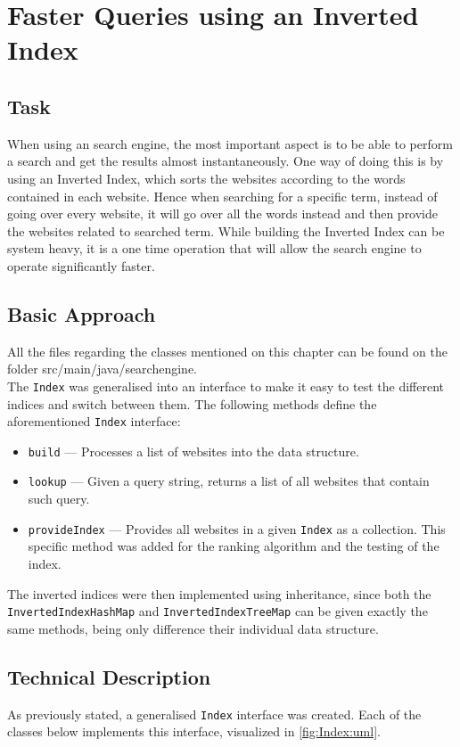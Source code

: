 \chapter{Faster Queries using an Inverted Index}

\section{Task}
When using an search engine, the most important aspect is to be able to perform a search and get the results almost instantaneously. One way of doing this is by using an Inverted Index, which sorts the websites according to the words contained in each website. Hence when searching for a specific term, instead of going over every website, it will go over all the words instead and then provide the websites related to searched term. While building the Inverted Index can be system heavy, it is a one time operation that will allow the search engine to operate significantly faster.

\section{Basic Approach}
All the files regarding the classes mentioned on this chapter can be found on the folder src/main/java/searchengine.\\
The {\tt Index} was generalised into an interface to make it easy to test the different indices and switch between them. The following methods define the aforementioned {\tt Index} interface:
\begin{itemize}
    \item {\tt build} — Processes a list of websites into the data structure.
    \item {\tt lookup} — Given a query string, returns a list of all websites that contain such query.
    \item {\tt provideIndex} — Provides all websites in a given {\tt Index} as a collection. This specific method was added for the ranking algorithm and the testing of the index.
\end{itemize}
The inverted indices were then implemented using inheritance, since both the {\tt InvertedIndexHashMap} and {\tt InvertedIndexTreeMap} can be given exactly the same methods, being only difference their individual data structure.

\section{Technical Description}
As previously stated, a generalised {\tt Index} interface was created. Each of the classes below implements this interface, visualized in \ref{fig:Index:uml}.

